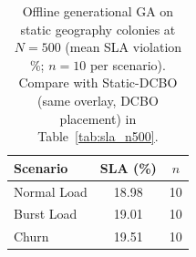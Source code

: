 \begin{table}[!t]
\centering
\caption{Offline generational GA on static geography colonies at $N=500$ (mean SLA violation \%; $n=10$ per scenario). Compare with Static-DCBO (same overlay, DCBO placement) in Table~\ref{tab:sla_n500}.}
\label{tab:offline_ga}
\fgcsTableCol
\begin{tabular*}{\columnwidth}{@{\extracolsep{\fill}}lcc@{}}
\toprule
\textbf{Scenario} & \textbf{SLA (\%)} & \textbf{$n$} \\
\midrule
Normal Load & 18.98 & 10 \\
Burst Load & 19.01 & 10 \\
Churn & 19.51 & 10 \\
\bottomrule
\end{tabular*}
\end{table}